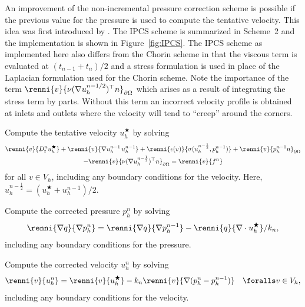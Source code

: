 An improvement of the non-incremental pressure correction scheme is
possible if the previous value for the pressure is used to compute the
tentative velocity. This idea was first introduced by
\citet{Goda1979}. The IPCS scheme is summarized in Scheme~2 and the
implementation is shown in Figure~\ref{fig:IPCS}. The IPCS scheme as
implemented here also differs from the Chorin scheme in that the
viscous term is evaluated at $(t_{n-1} + t_n)/2$ and a stress
formulation is used in place of the Laplacian formulation used for the
Chorin scheme. Note the importance of the term $\renni{v}{\nu (\nabla
  u_h^{n-1/2})^{\top} n}_{\partial\Omega}$ which arises as a result of
integrating the stress term by parts. Without this term an incorrect
velocity profile is obtained at inlets and outlets where the velocity
will tend to ``creep'' around the corners.

{
\item
  Compute the tentative velocity $u_h^\bigstar$ by solving
  \begin{multline}\label{eq:ipcs,1}
      \renni{v}{D_t^n u_h^{\bigstar}}
      + \renni{v}{\nabla u_h^{n-1} \, u_h^{n-1}}
      + \renni{\epsilon(v)}{\sigma(u_h^{n-\frac{1}{2}}, p^{n-1}_h)}
      + \renni{v}{p^{n-1}_h n}_{\partial\Omega}
      \\
      - \renni{v}{\nu (\nabla u_h^{n-\frac{1}{2}})^{\top} n}_{\partial\Omega}
      = \renni{v}{f^n}
  \end{multline}
  for all $v \in V_h$, including any boundary conditions for the
  velocity. Here, $u_h^{n-\frac{1}{2}} = (u_h^{\bigstar} + u_h^{n-1}) / 2$.

\item
  Compute the corrected pressure $p_h^n$ by solving
  \begin{equation}\label{eq:ipcs,2}
    \renni{\nabla q}{\nabla p^n_h}
    = \renni{\nabla q}{\nabla p^{n-1}_h} - \renni{q}{\nabla \cdot u_h^{\bigstar}} / k_n,
  \end{equation}
  including any boundary conditions for the pressure.

\item
  Compute the corrected velocity $u_h^n$ by solving
  \begin{equation}\label{eq:ipcs,3}
    \renni{v}{u_h^n} = \renni{v}{u_h^{\bigstar}} - k_n\renni{v}{\nabla(p_h^n-p_h^{n-1})}
    \quad \foralls v \in V_h,
  \end{equation}
  including any boundary conditions for the
  velocity.
  \label{ipcs_listing}
}


